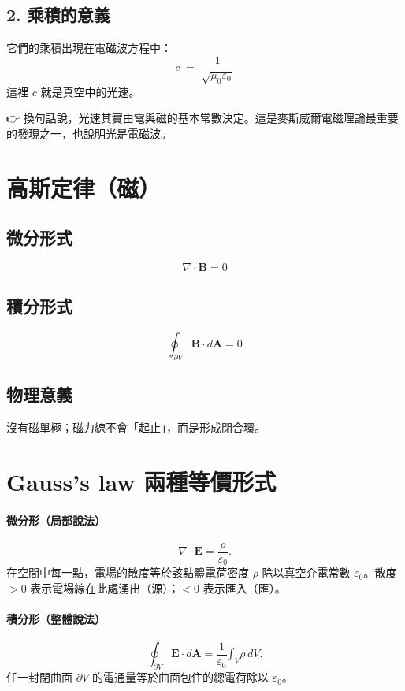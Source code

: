 \documentclass{article}
\def\int{\text{∫}}%
\begin{document}
\subsection*{2. 乘積的意義}
它們的乘積出現在電磁波方程中：
\[
c \;=\; \frac{1}{\sqrt{\mu_0 \varepsilon_0}}
\]
這裡 $c$ 就是真空中的光速。

\medskip
👉 換句話說，光速其實由電與磁的基本常數決定。這是麥斯威爾電磁理論最重要的發現之一，也說明光是電磁波。
\section*{高斯定律（磁）}

\subsection*{微分形式}
\begin{equation}
\nabla \cdot \mathbf{B} = 0
\end{equation}

\subsection*{積分形式}
\begin{equation}
\oint_{\partial V} \mathbf{B} \cdot d\mathbf{A} = 0
\end{equation}

\subsection*{物理意義}
沒有磁單極；磁力線不會「起止」，而是形成閉合環。

\section{Gauss's law 兩種等價形式}

\paragraph{微分形（局部說法）}
\begin{equation}
\nabla\!\cdot\!\mathbf{E}=\frac{\rho}{\varepsilon_0}.
\end{equation}
在空間中每一點，電場的散度等於該點體電荷密度 $\rho$ 除以真空介電常數 $\varepsilon_0$。散度 $>0$ 表示電場線在此處湧出（源）；$<0$ 表示匯入（匯）。

\paragraph{積分形（整體說法）}
\begin{equation}
\oint_{\partial V}\mathbf{E}\cdot d\mathbf{A}
=\frac{1}{\varepsilon_0}\int_V \rho\, dV.
\end{equation}
任一封閉曲面 $\partial V$ 的電通量等於曲面包住的總電荷除以 $\varepsilon_0$。
\end{document}
